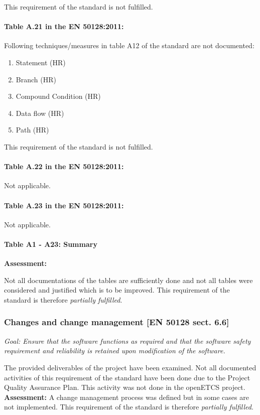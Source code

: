 This requirement of the standard is not fulfilled.

\paragraph{Table A.21 in the EN 50128:2011:}
Following techniques/measures in table A12 of the standard are not documented:

\begin{enumerate}	
\item	Statement (HR)
\item	Branch (HR)
\item	Compound Condition (HR)
\item	Data flow (HR)
\item	Path (HR)
\end{enumerate}

This requirement of the standard is not fulfilled.

\paragraph{Table A.22 in the EN 50128:2011:}
Not applicable.

\paragraph{Table A.23 in the EN 50128:2011:}
Not applicable.


\paragraph{Table A1 - A23: Summary}

\textbf{Assessment:}

Not all documentations of the tables are sufficiently done and not all tables were considered and justified which is to be improved.
This requirement of the standard is therefore \textit{partially fulfilled}.


\subsubsection{Changes and change management [EN 50128 sect. 6.6]}
\textit{Goal: Ensure that the software functions as required and that the software safety requirement and reliability is retained upon modification of the software.}

The provided deliverables of the project have been examined. Not all documented activities of this requirement of the standard have been done due to the Project Quality Assurance Plan. 
\bigskip
This activity was not done in the openETCS project.
\textbf{Assessment:}
\bigskip
A change management process was defined but in some cases are not implemented.
This requirement of the standard is therefore \textit{partially fulfilled}.
\bigskip

